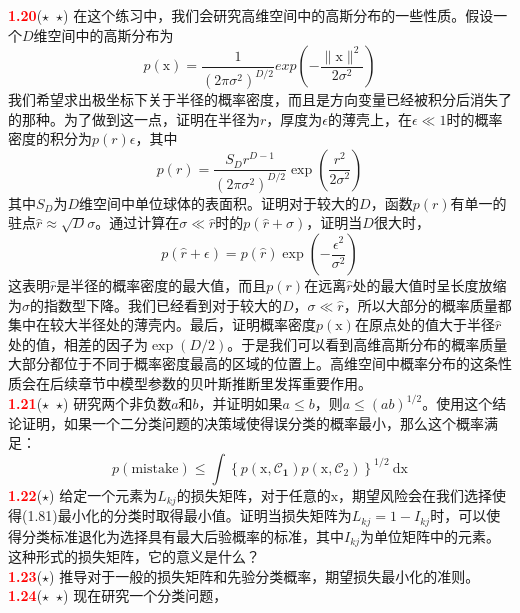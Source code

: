 \documentclass{book}
\numberwithin{equation}{chapter}
\newcommand {\bx} {\boldsymbol{\mathrm{x}}}
\begin{document}
{	\textcolor{red}{\textbf{1.20}}\quad ($\star$\ $\star$) 在这个练习中，我们会研究高维空间中的高斯分布的一些性质。假设一个$D$维空间中的高斯分布为
	\begin{equation}
		p(\boldsymbol{\mathrm{x}})=\frac{1}{(2\pi\sigma^2)^{D/2}} exp \left(-\frac{\|\boldsymbol{\mathrm{x}}\|^2}{2\sigma^2}\right)
	\end{equation}
	我们希望求出极坐标下关于半径的概率密度，而且是方向变量已经被积分后消失了的那种。为了做到这一点，证明在半径为$r$，厚度为$\epsilon$的薄壳上，在$\epsilon \ll 1$时的概率密度的积分为$p(r)\epsilon$，其中
	\begin{equation}
		p(r)=\frac{S_D r^{D-1}}{(2\pi\sigma^2)^{D/2}}\exp\left(\frac{r^2}{2\sigma^2}\right)
	\end{equation}
	其中$S_D$为$D$维空间中单位球体的表面积。证明对于较大的$D$，函数$p(r)$有单一的驻点$\hat{r}\approx \sqrt{D}\sigma$。通过计算在$\sigma \ll \hat{r}$时的$p(\hat{r}+\sigma)$，证明当$D$很大时，
	\begin{equation}
		p(\hat{r}+\epsilon)=p(\hat{r})\exp\left(-\frac{\epsilon^2}{\sigma^2}\right)
	\end{equation}
	这表明$\hat{r}$是半径的概率密度的最大值，而且$p(r)$在远离$\hat{r}$处的最大值时呈长度放缩为$\sigma$的指数型下降。我们已经看到对于较大的$D$，$\sigma \ll \hat{r}$，所以大部分的概率质量都集中在较大半径处的薄壳内。最后，证明概率密度$p(\boldsymbol{\mathrm{x}})$在原点处的值大于半径$\hat{r}$处的值，相差的因子为$\exp(D/2)$。于是我们可以看到高维高斯分布的概率质量大部分都位于不同于概率密度最高的区域的位置上。高维空间中概率分布的这条性质会在后续章节中模型参数的贝叶斯推断里发挥重要作用。\\
	\textcolor{red}{\textbf{1.21}}\quad ($\star$\ $\star$) 研究两个非负数$a$和$b$，并证明如果$a \leqslant b$，则$a \leqslant (ab)^{1/2}$。使用这个结论证明，如果一个二分类问题的决策域使得误分类的概率最小，那么这个概率满足：
	\begin{equation}
		p(\mathrm{mistake})\leqslant \int \left\{p(\boldsymbol{\mathrm{x},\mathcal{C}_1})p(\boldsymbol{\mathrm{x}},\mathcal{C}_2)\right\}^{1/2}\ \mathrm{d}\boldsymbol{\mathrm{x}}
	\end{equation}
	\textcolor{red}{\textbf{1.22}}\quad ($\star$) 给定一个元素为$L_{kj}$的损失矩阵，对于任意的$\bx$，期望风险会在我们选择使得(1.81)最小化的分类时取得最小值。证明当损失矩阵为$L_{kj}=1-I_{kj}$时，可以使得分类标准退化为选择具有最大后验概率的标准，其中$I_{kj}$为单位矩阵中的元素。这种形式的损失矩阵，它的意义是什么？\\
	\textcolor{red}{\textbf{1.23}}\quad ($\star$) 推导对于一般的损失矩阵和先验分类概率，期望损失最小化的准则。\\
	\textcolor{red}{\textbf{1.24}}\quad ($\star$\ $\star$) 现在研究一个分类问题，
	}
\end{document}
